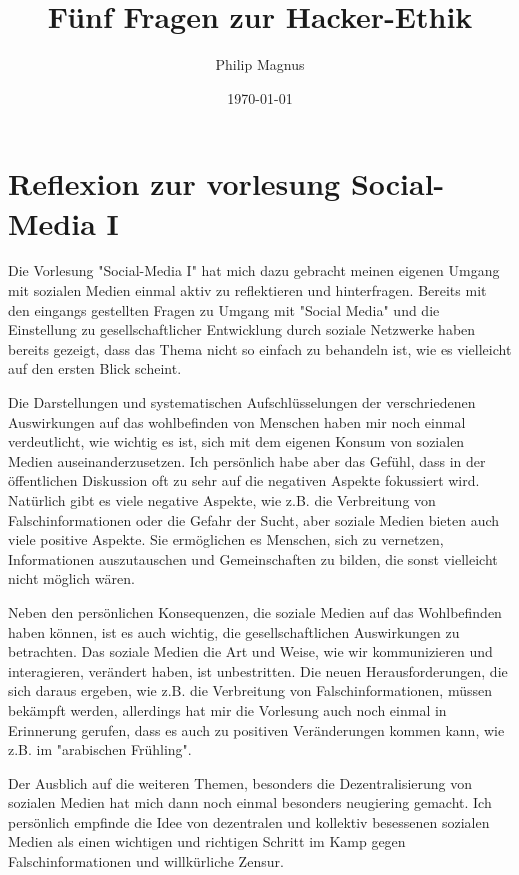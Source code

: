 \documentclass[12pt]{article}
\title{Fünf Fragen zur Hacker-Ethik}
\author{Philip Magnus}
\date{\today}
\begin{document}
\maketitle

\section{Reflexion zur vorlesung Social-Media I}

Die Vorlesung "Social-Media I" hat mich dazu gebracht meinen eigenen Umgang mit sozialen Medien einmal aktiv zu reflektieren und hinterfragen. Bereits mit den eingangs gestellten Fragen zu Umgang mit "Social Media" und die 
Einstellung zu gesellschaftlicher Entwicklung durch soziale Netzwerke haben bereits gezeigt, dass das Thema nicht so einfach zu behandeln ist, wie es vielleicht auf den ersten Blick scheint.

\vspace{1em}

Die Darstellungen und systematischen Aufschlüsselungen der verschriedenen Auswirkungen auf das wohlbefinden von Menschen haben mir noch einmal verdeutlicht, wie wichtig es ist, sich mit dem eigenen Konsum von sozialen Medien auseinanderzusetzen.
Ich persönlich habe aber das Gefühl, dass in der öffentlichen Diskussion oft zu sehr auf die negativen Aspekte fokussiert wird. Natürlich gibt es viele negative Aspekte, wie z.B. die Verbreitung von Falschinformationen oder die Gefahr der Sucht, aber soziale Medien bieten auch viele
positive Aspekte. Sie ermöglichen es Menschen, sich zu vernetzen, Informationen auszutauschen und Gemeinschaften zu bilden, die sonst vielleicht nicht möglich wären.

\vspace{1em}

Neben den persönlichen Konsequenzen, die soziale Medien auf das Wohlbefinden haben können, ist es auch wichtig, die gesellschaftlichen Auswirkungen zu betrachten. Das soziale Medien die Art und Weise, wie wir kommunizieren und interagieren, verändert haben, ist unbestritten.
Die neuen Herausforderungen, die sich daraus ergeben, wie z.B. die Verbreitung von Falschinformationen, müssen bekämpft werden, allerdings hat mir die Vorlesung auch noch einmal in Erinnerung gerufen, dass es auch zu positiven Veränderungen kommen kann, wie z.B. im "arabischen Frühling".

\vspace{1em}

Der Ausblich auf die weiteren Themen, besonders die Dezentralisierung von sozialen Medien hat mich dann noch einmal besonders neugiering gemacht. Ich persönlich empfinde die Idee von dezentralen und kollektiv besessenen sozialen Medien als einen wichtigen und richtigen Schritt
im Kamp gegen Falschinformationen und willkürliche Zensur.
\end{document}
